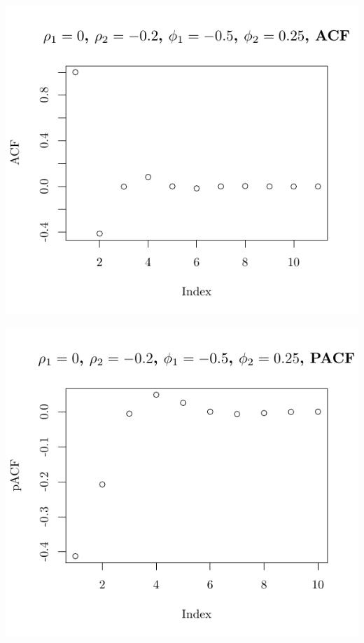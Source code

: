 \documentclass[10pt]{paper}\usepackage[]{graphicx}\usepackage[]{color}
\makeatletter
\def\maxwidth{ %
  \ifdim\Gin@nat@width>\linewidth
    \linewidth
  \else
    \Gin@nat@width
  \fi
}
\newenvironment{knitrout}{}{} %
\makeatother
\begin{document}
\begin{knitrout}
{\centering \includegraphics[width=\maxwidth]{figure/graphics-plotter-67} 

}




{\centering \includegraphics[width=\maxwidth]{figure/graphics-plotter-68} 

}





\end{knitrout}
\end{document}
